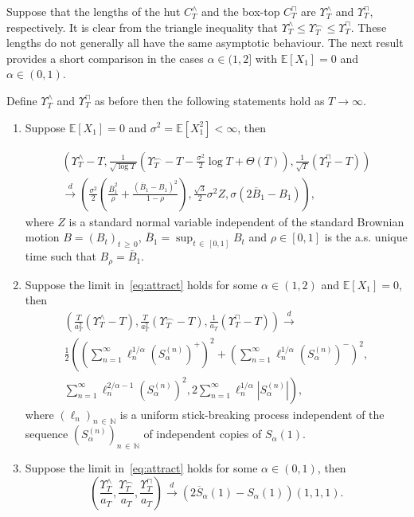 \documentclass[10pt]{amsart}
\theoremstyle{definition}\newtheorem{defi}[theo]{Definition}\newtheorem{rema}[theo]{Remark}\newtheorem{exam}[theo]{Example}\newtheorem{exem}[theo]{Example}\newtheorem{nota}[theo]{Notation}
\newcommand\N{\mathbb{N}}
\newcommand\E{\mathds{E}}
\newcommand\1{\mathds{1}}
\newcommand\cid{\xrightarrow{d}}
\newcommand\ov[1]{\overline{#1}}
\newcommand*{\alphenumi}{\renewcommand*{\theenumi}{\alph{enumi}}}
\begin{document}
\label{page:Fig_2}
Suppose that the lengths of the hut $C^\wedge_T$ and the box-top $C^\sqcap_T$ are $\Upsilon^\wedge_T$ and $\Upsilon^\sqcap_T$, respectively. It is clear from the triangle inequality that $\Upsilon^\wedge_T\le\Upsilon_T^\frown\le\Upsilon^\sqcap_T$. These lengths do not generally all have the same asymptotic behaviour. The next result provides a short comparison in the cases $\alpha\in(1,2]$ with $\E[X_1]=0$ and $\alpha\in(0,1)$.

\begin{prop}\label{prop:compare_length}
Define $\Upsilon^\wedge_T$ and $\Upsilon^\sqcap_T$ as before then the following statements hold as $T\to\infty$.
\begin{enumerate}\alphenumi
\item\label{prop1.8.a} Suppose $\E[X_1]=0$ and $\sigma^2=\E[X_1^2]<\infty$, then

\begin{multline*}
\left(\Upsilon^\wedge_T-T,
\frac{1}{\sqrt{\log T}}
\left(\Upsilon_T^{\frown} -T-\frac{\sigma^2}{2}\log T +\Theta(T)\right),\frac{1}{\sqrt{T}}\left(\Upsilon^\sqcap_T-T\right)\right)\\
\cid
\left(
\frac{\sigma^2}{2}\left(\frac{\ov B_1^2}{\rho} +\frac{\left(\ov B_1-B_1\right)^2}{1-\rho}\right),
\frac{\sqrt{3}}{2}\sigma^2Z,\sigma\left(2\ov B_1-B_1\right)\right),
\end{multline*}
where $Z$ is a standard normal variable independent of the standard Brownian motion $B=(B_t)_{t\,\ge\,0}$, $\ov B_1=\sup_{t\,\in\,[0,1]}B_t$ and $\rho\in[0,1]$ is the a.s. unique time such that $B_\rho=\ov B_1$.
\item\label{prop1.8.b} Suppose the limit in~\eqref{eq:attract} holds for some $\alpha\in(1,2)$ and $\E[X_1]=0$, then
\begin{multline*}
\left(\frac{T}{a_T^2}\left(\Upsilon^\wedge_T-T\right),
\frac{T}{a_T^2}\left(\Upsilon^\frown_T-T\right),\frac{1}{a_T}\left(\Upsilon^\sqcap_T-T\right)\right)
\cid\\
\frac{1}{2}\left(
\left(\sum_{n=1}^\infty
\ell_n^{1/\alpha}\left(S_\alpha^{(n)}\right)^+\right)^2 +\left(\sum_{n=1}^\infty
\ell_n^{1/\alpha}\left(S_\alpha^{(n)}\right)^-\right)^2,\right.\\
\left.\sum_{n=1}^\infty
\ell_n^{2/\alpha-1}\left(S_\alpha^{(n)}\right)^2,2\sum_{n=1}^\infty
\ell_n^{1/\alpha}\left|S_\alpha^{(n)}\right|\right),
\end{multline*}
where $(\ell_n)_{n\,\in\,\N}$ is a uniform stick-breaking process independent of the sequence $(S_\alpha^{(n)})_{n\,\in\,\N}$ of independent copies of $S_\alpha(1)$.
\item\label{prop1.8.c} Suppose the limit in~\eqref{eq:attract} holds for some $\alpha\in(0,1)$, then
\[
\left(\frac{\Upsilon^\wedge_T}{a_T},
\frac{\Upsilon^\frown_T}{a_T},
\frac{\Upsilon^\sqcap_T}{a_T}\right)
\cid \left(2\ov{S}_\alpha(1)-S_\alpha(1)\right)(1,1,1).
\]
\end{enumerate}
\end{prop}
\end{document}

